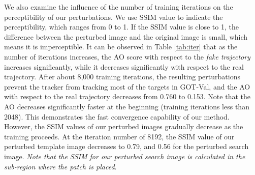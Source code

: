 \documentclass[journal]{IEEEtran}
\begin{document}
We also examine the influence of the number of training iterations on the perceptibility of our perturbations. We use SSIM value to indicate the perceptibility, which ranges from 0 to 1. If the SSIM value is close to 1, the difference between the perturbed image and the original image is small, which means it is imperceptible. It can be observed in Table \ref{tab:iter} that as the number of iterations increases, the AO score with respect to the \textit{fake trajectory} increases significantly, while it decreases significantly with respect to the real trajectory. After about 8,000 training iterations, the resulting perturbations prevent the tracker from tracking most of the targets in GOT-Val, and the AO with respect to the real trajectory decreases from 0.760 to 0.153. Note that the AO decreases significantly faster at the beginning (training iterations less than 2048). This demonstrates the fast convergence capability of our method. However, the SSIM values of our perturbed images gradually decrease as the training proceeds. At the iteration number of 8192, the SSIM value of our perturbed template image decreases to 0.79, and 0.56 for the perturbed search image. \textit{Note that the SSIM for our perturbed search image is calculated in the sub-region where the patch is placed}.

\end{document}
